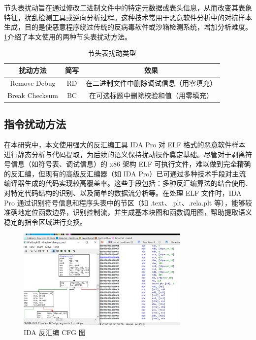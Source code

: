 节头表扰动旨在通过修改二进制文件中的特定元数据或表头信息，从而改变其表象特征，扰乱检测工具或逆向分析过程。这种技术常用于恶意软件分析中的对抗样本生成，目的是使恶意程序绕过传统的反病毒软件或沙箱检测系统，增加分析难度。\ref{tab:4.5}介绍了本文使用的两种节头表扰动方法。

\begin{table}[htbp]
	\centering
	\caption{节头表扰动类型}\label{tab:4.5}
	\begin{tabular*}{0.9\textwidth}{@{\extracolsep{\fill}}ccc}
		\toprule
		扰动方法 & 简写 & 效果 \\
		\midrule
		Remove Debug & RD & 在二进制文件中删除调试信息（用零填充） \\
		Break Checksum & BC & 在可选标题中删除校验和值（用零填充） \\
		\bottomrule
	\end{tabular*}
\end{table}

\subsection{指令扰动方法}

在本研究中，本文使用强大的反汇编工具 IDA Pro 对 ELF 格式的恶意软件样本进行静态分析与代码提取，为后续的语义保持扰动操作奠定基础。尽管对于剥离符号信息（如符号表、调试信息）的 x86 架构 ELF 可执行文件，难以做到完全精确的反汇编，但现有的高级反汇编器（如 IDA Pro）已可通过多种技术手段对主流编译器生成的代码实现较高覆盖率。这些手段包括：多种反汇编算法的结合使用、对特定代码结构的识别、以及简单的数据流分析等。在处理 ELF 文件时，IDA Pro 通过识别符号信息和程序头表中的节区（如 .text、.plt、.rela.plt 等），能够较准确地定位函数边界，识别控制流，并生成基本块图和函数调用图，帮助提取语义稳定的指令区域进行变换。

\begin{figure}[hbt]
	\centering
	\includegraphics[width=0.75\textwidth]{figures/4.1}
	\caption{IDA 反汇编 CFG 图}\label{fig:4.1}
\end{figure}


